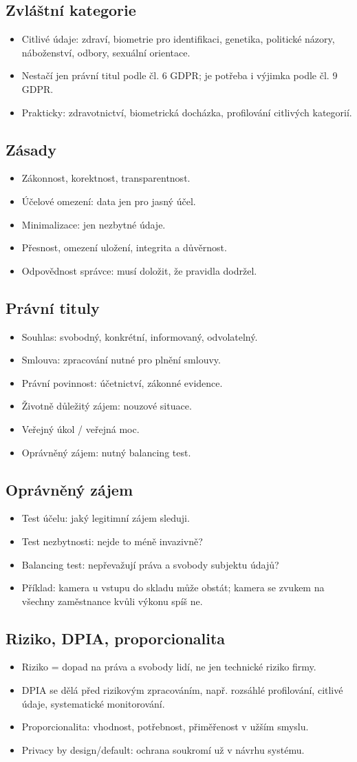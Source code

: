 \documentclass[10pt,a4paper]{article}
\newcommand{\blok}[1]{\subsection*{#1}}
\begin{document}
\blok{Zvláštní kategorie}
\begin{itemize}
  \item Citlivé údaje: zdraví, biometrie pro identifikaci, genetika, politické názory, náboženství, odbory, sexuální orientace.
  \item Nestačí jen právní titul podle čl. 6 GDPR; je potřeba i výjimka podle čl. 9 GDPR.
  \item Prakticky: zdravotnictví, biometrická docházka, profilování citlivých kategorií.
\end{itemize}

\blok{Zásady}
\begin{itemize}
  \item Zákonnost, korektnost, transparentnost.
  \item Účelové omezení: data jen pro jasný účel.
  \item Minimalizace: jen nezbytné údaje.
  \item Přesnost, omezení uložení, integrita a důvěrnost.
  \item Odpovědnost správce: musí doložit, že pravidla dodržel.
\end{itemize}

\blok{Právní tituly}
\begin{itemize}
  \item Souhlas: svobodný, konkrétní, informovaný, odvolatelný.
  \item Smlouva: zpracování nutné pro plnění smlouvy.
  \item Právní povinnost: účetnictví, zákonné evidence.
  \item Životně důležitý zájem: nouzové situace.
  \item Veřejný úkol / veřejná moc.
  \item Oprávněný zájem: nutný balancing test.
\end{itemize}

\blok{Oprávněný zájem}
\begin{itemize}
  \item Test účelu: jaký legitimní zájem sleduji.
  \item Test nezbytnosti: nejde to méně invazivně?
  \item Balancing test: nepřevažují práva a svobody subjektu údajů?
  \item Příklad: kamera u vstupu do skladu může obstát; kamera se zvukem na všechny zaměstnance kvůli výkonu spíš ne.
\end{itemize}

\blok{Riziko, DPIA, proporcionalita}
\begin{itemize}
  \item Riziko = dopad na práva a svobody lidí, ne jen technické riziko firmy.
  \item DPIA se dělá před rizikovým zpracováním, např. rozsáhlé profilování, citlivé údaje, systematické monitorování.
  \item Proporcionalita: vhodnost, potřebnost, přiměřenost v užším smyslu.
  \item Privacy by design/default: ochrana soukromí už v návrhu systému.
\end{itemize}
\end{document}
